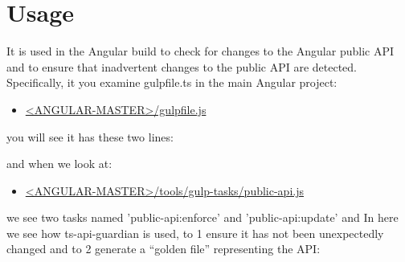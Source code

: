 \section{Usage}

It is used in the Angular build to check for changes to the Angular public API and to
ensure that inadvertent changes to the public API are detected. Specifically, it you
examine gulpfile.ts in the main Angular project:

\begin{itemize}
  \item \href{https://github.com/angular/angular/blob/master/gulpfile.js}
        {<ANGULAR-MASTER>/gulpfile.js}
\end{itemize}

you will see it has these two lines:



and when we look at:

\begin{itemize}
  \item \href{https://github.com/angular/angular/blob/master/tools/gulp-tasks/public-api.js}
        {<ANGULAR-MASTER>/tools/gulp-tasks/public-api.js}
\end{itemize}

we see two tasks named 'public-api:enforce' and 'public-api:update' and In here we
see how ts-api-guardian is used, to
1
ensure it has not been unexpectedly changed
and to
2
generate a “golden file” representing the API:


